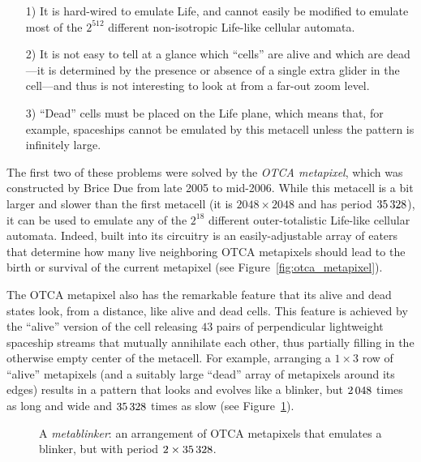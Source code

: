 \begin{itemize}
	\item[1)] It is hard-wired to emulate Life, and cannot easily be modified to emulate most of the $2^{512}$ different non-isotropic Life-like cellular automata.\smallskip
	
	\item[2)] It is not easy to tell at a glance which ``cells'' are alive and which are dead---it is determined by the presence or absence of a single extra glider in the cell---and thus is not interesting to look at from a far-out zoom level.\smallskip
	
	\item[3)] ``Dead'' cells must be placed on the Life plane, which means that, for example, spaceships cannot be emulated by this metacell unless the pattern is infinitely large.\smallskip
\end{itemize}

The first two of these problems were solved by the \emph{OTCA metapixel}, which was constructed by Brice Due from late 2005 to mid-2006. While this metacell is a bit larger and slower than the first metacell (it is $2048 \times 2048$ and has period $35{\,}328$), it can be used to emulate any of the $2^{18}$ different outer-totalistic Life-like cellular automata. Indeed, built into its circuitry is an easily-adjustable array of eaters that determine how many live neighboring OTCA metapixels should lead to the birth or survival of the current metapixel (see Figure~\ref{fig:otca_metapixel}). 


The OTCA metapixel also has the remarkable feature that its alive and dead states look, from a distance, like alive and dead cells. This feature is achieved by the ``alive'' version of the cell releasing $43$ pairs of perpendicular lightweight spaceship streams that mutually annihilate each other, thus partially filling in the otherwise empty center of the metacell. For example, arranging a $1 \times 3$ row of ``alive'' metapixels (and a suitably large ``dead'' array of metapixels around its edges) results in a pattern that looks and evolves like a blinker, but $2{\,}048$ times as long and wide and $35{\,}328$ times as slow (see Figure~\ref{fig:metablinker}).

\begin{figure}[!htb]
	\centering
	\caption{A \emph{metablinker}: an arrangement of OTCA metapixels that emulates a blinker, but with period $2 \times 35{\,}328$.}\label{fig:metablinker}
\end{figure}


